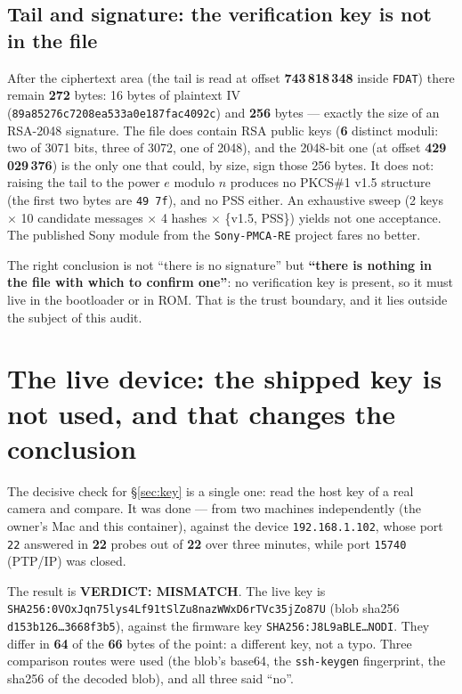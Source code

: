 \documentclass[12pt]{article}
\newcommand{\code}[1]{\texttt{\small #1}}
\newcommand{\hx}[1]{\texttt{\footnotesize #1}}
\newcommand{\hl}[1]{\texttt{\footnotesize #1}}
\begin{document}
\subsection{Tail and signature: the verification key is not in the file}

After the ciphertext area (the tail is read at offset \textbf{743\,818\,348} inside \code{FDAT})
there remain \textbf{272} bytes: 16 bytes of plaintext IV
(\hl{89a85276c720\allowbreak 8ea533a0e187\allowbreak fac4092c}) and \textbf{256} bytes --- exactly the size of an
RSA-2048 signature. The file does contain RSA public keys (\textbf{6} distinct moduli: two of
3071 bits, three of 3072, one of 2048), and the 2048-bit one (at offset
\textbf{429\,029\,376}) is the only one that could, by size, sign those 256 bytes. It does not:
raising the tail to the power $e$ modulo $n$ produces no PKCS\#1 v1.5 structure (the first two
bytes are \hx{49 7f}), and no PSS either. An exhaustive sweep (2 keys $\times$ 10 candidate
messages $\times$ 4 hashes $\times$ \{v1.5, PSS\}) yields not one acceptance. The published
Sony module from the \code{Sony-PMCA-RE} project fares no better.

The right conclusion is not ``there is no signature'' but \textbf{``there is nothing in the
file with which to confirm one''}: no verification key is present, so it must live in the
bootloader or in ROM. That is the trust boundary, and it lies outside the subject of this
audit.

\section{The live device: the shipped key is not used, and that changes the conclusion}
\label{sec:live}

The decisive check for \S\ref{sec:key} is a single one: read the host key of a real camera and
compare. It was done --- from two machines independently (the owner's Mac and this container),
against the device \code{192.168.1.102}, whose port \code{22} answered in \textbf{22} probes out
of \textbf{22} over three minutes, while port \code{15740} (PTP/IP) was closed.

The result is \textbf{VERDICT: MISMATCH}. The live key is
\hl{SHA256:0VOxJ\allowbreak qn75lys4Lf91\allowbreak tSlZu8nazWWx\allowbreak D6rTVc35jZo8\allowbreak 7U} (blob sha256
\hx{d153b126\ldots 3668f3b5}), against the firmware key
\hx{SHA256:J8L9aBLE\ldots NODI}. They differ in \textbf{64} of the \textbf{66} bytes of the
point: a different key, not a typo. Three comparison routes were used (the blob's base64, the
\code{ssh-keygen} fingerprint, the sha256 of the decoded blob), and all three said ``no''.
\end{document}

